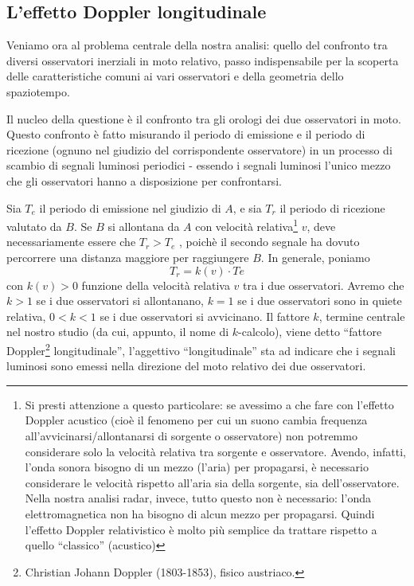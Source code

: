 \subsection{L'effetto Doppler longitudinale}
Veniamo ora al problema centrale della nostra analisi: quello del confronto tra diversi 
osservatori inerziali in moto relativo, passo indispensabile per la scoperta delle 
caratteristiche comuni ai vari osservatori e della geometria dello spaziotempo.

Il nucleo della questione è il confronto tra gli orologi dei due osservatori
in moto. Questo confronto è fatto misurando il periodo di emissione e il
periodo di ricezione (ognuno nel giudizio del corrispondente osservatore) in un
processo di scambio di segnali luminosi periodici - essendo i segnali luminosi
l'unico mezzo che gli osservatori hanno a disposizione per confrontarsi.

Sia $T_e$ il periodo di emissione nel giudizio di $A$, e sia $T_r$ il periodo di
ricezione valutato da $B$. Se $B$ si allontana da $A$ con velocità 
relativa\footnote{Si presti attenzione a questo particolare: se avessimo a che fare con l'effetto Doppler acustico
(cioè il fenomeno per cui un suono cambia frequenza all'avvicinarsi/allontanarsi di sorgente o osservatore) 
non potremmo considerare solo la velocità relativa tra sorgente e osservatore.
Avendo, infatti, l'onda sonora bisogno di un mezzo (l'aria) per propagarsi, è necessario
considerare le velocità rispetto all'aria sia della sorgente, sia dell'osservatore. Nella nostra
analisi radar, invece, tutto questo non è necessario: l'onda elettromagnetica non ha bisogno 
di alcun mezzo per propagarsi. Quindi l'effetto Doppler relativistico è molto più
semplice da trattare rispetto a quello ``classico'' (acustico)} $v$,
deve necessariamente essere che $T_r > T_e$ , poichè il secondo segnale ha dovuto
percorrere una distanza maggiore per raggiungere $B$. In generale, poniamo
\begin{equation}
T_r = k(v) \cdot Te  
\end{equation}
con $k(v) > 0$ funzione della velocità relativa $v$ tra i due
osservatori. Avremo che $k > 1$ se i due osservatori si allontanano, $k = 1$ se
i due osservatori sono in quiete relativa, $0 < k < 1$ se i due osservatori si
avvicinano. Il fattore $k$, termine centrale nel nostro studio (da cui, appunto,
il nome di $k$-calcolo), viene detto ``fattore 
Doppler\footnote{Christian Johann Doppler (1803-1853), fisico austriaco.}
 longitudinale'', l'aggettivo ``longitudinale'' sta ad indicare che i segnali luminosi sono emessi
nella direzione del moto relativo dei due osservatori.

